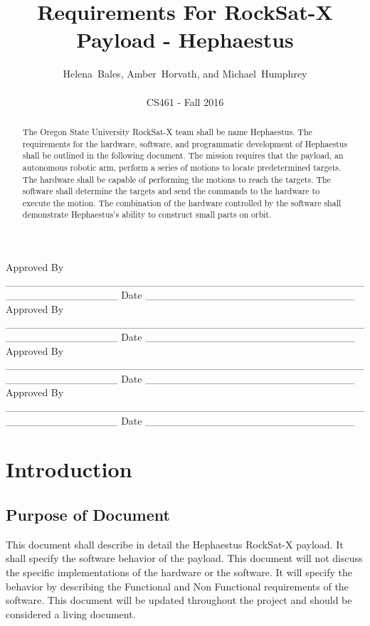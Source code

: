\documentclass[letterpaper,10pt]{article}
\title{Requirements For RockSat-X Payload - Hephaestus}
\author{Helena~Bales, Amber~Horvath, and Michael~Humphrey\\ \\ CS461 - Fall 2016}
\newenvironment{bottompar}{\par\vspace*{\fill}}{\clearpage}
\begin{document}
\maketitle

\begin{abstract}
The Oregon State University RockSat-X team shall be name Hephaestus.
The requirements for the hardware, software, and programmatic development of Hephaestus shall be outlined in the following document.
The mission requires that the payload, an autonomous robotic arm, perform a series of motions to locate predetermined targets.
The hardware shall be capable of performing the motions to reach the targets.
The software shall determine the targets and send the commands to the hardware to execute the motion.
The combination of the hardware controlled by the software shall demonstrate Hephaestus's ability to construct small parts on orbit.
\end{abstract}

\begin{bottompar}
Approved By
\_\_\_\_\_\_\_\_\_\_\_\_\_\_\_\_\_\_\_\_\_\_\_\_\_\_\_\_\_\_\_\_\_\_\_\_\_\_\_\_\_\_\_\_\_\_\_\_\_\_\_\_\_\_\_\_\_\_\_\_\_\_\_
Date \_\_\_\_\_\_\_\_\_\_\_\_\_\_\_\_\_\_\_\_\_\_\_\_\_\_\_\_ \\


Approved By
\_\_\_\_\_\_\_\_\_\_\_\_\_\_\_\_\_\_\_\_\_\_\_\_\_\_\_\_\_\_\_\_\_\_\_\_\_\_\_\_\_\_\_\_\_\_\_\_\_\_\_\_\_\_\_\_\_\_\_\_\_\_\_
Date \_\_\_\_\_\_\_\_\_\_\_\_\_\_\_\_\_\_\_\_\_\_\_\_\_\_\_\_ \\


Approved By
\_\_\_\_\_\_\_\_\_\_\_\_\_\_\_\_\_\_\_\_\_\_\_\_\_\_\_\_\_\_\_\_\_\_\_\_\_\_\_\_\_\_\_\_\_\_\_\_\_\_\_\_\_\_\_\_\_\_\_\_\_\_\_
Date \_\_\_\_\_\_\_\_\_\_\_\_\_\_\_\_\_\_\_\_\_\_\_\_\_\_\_\_ \\


Approved By
\_\_\_\_\_\_\_\_\_\_\_\_\_\_\_\_\_\_\_\_\_\_\_\_\_\_\_\_\_\_\_\_\_\_\_\_\_\_\_\_\_\_\_\_\_\_\_\_\_\_\_\_\_\_\_\_\_\_\_\_\_\_\_
Date \_\_\_\_\_\_\_\_\_\_\_\_\_\_\_\_\_\_\_\_\_\_\_\_\_\_\_\_ \\
\end{bottompar}

\clearpage
\tableofcontents
\clearpage

\section{Introduction}
\subsection{Purpose of Document}
This document shall describe in detail the Hephaestus RockSat-X payload.
It shall specify the software behavior of the payload.
This document will not discuss the specific implementations of the hardware or the software.
It will specify the behavior by describing the Functional and Non Functional requirements of the software.
This document will be updated throughout the project and should be considered a living document.
\end{document}
